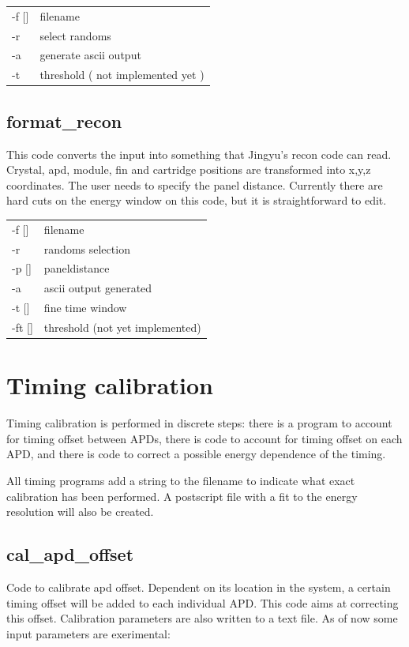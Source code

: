 \documentclass[12pt]{article}
\begin{document}
\begin{tabular}{ll}
-f [] & filename \\
-r & select randoms\\ 
-a & generate ascii output\\
-t & threshold ( not implemented yet ) \\
\end{tabular}

\subsection{format\_recon}
This code converts the input into something that Jingyu's recon code can read. Crystal, apd, module, fin and cartridge positions are transformed into x,y,z coordinates. The user needs to specify the panel distance. Currently there are hard cuts on the energy window on this code, but it is straightforward to edit. \\

\begin{tabular}{ll}
-f [] & filename \\
-r & randoms selection \\
-p [] & paneldistance \\
-a & ascii output generated\\
-t [] & fine time window \\
-ft [] & threshold (not yet implemented)\\
\end{tabular}


\section{Timing calibration}
Timing calibration is performed in discrete steps: there is a program to account for timing offset between APDs, there is code to account for timing offset on each APD, and there is code to correct a possible energy dependence of the timing.

All timing programs add a string to the filename to indicate what exact calibration has been performed. A postscript file with a fit to the energy resolution will also be created. 


\subsection{cal\_apd\_offset}
Code to calibrate apd offset. Dependent on its location in the system, a certain timing offset will be added to each individual APD. This code aims at correcting this offset. Calibration parameters are also written to a text file. As of now some input parameters are exerimental:\\
\end{document}
